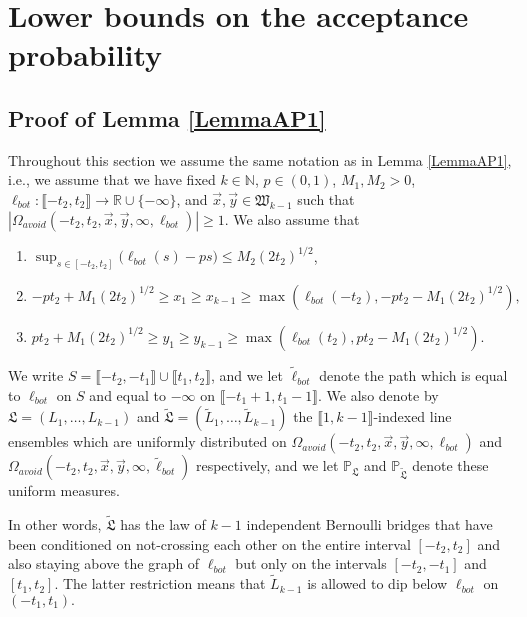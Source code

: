 %
\section{Lower bounds on the acceptance probability}\label{Section6}

\subsection{Proof of Lemma \ref{LemmaAP1}}\label{sect61} Throughout this section we assume the same notation as in Lemma \ref{LemmaAP1}, i.e., we assume that we have fixed $k \in \mathbb{N}$, $p \in (0,1)$, $M_1, M_2 > 0$, $\ell_{bot}: \llbracket -t_2, t_2 \rrbracket \rightarrow \mathbb{R} \cup \{ - \infty \}$, and $\vec{x}, \vec{y} \in \mathfrak{W}_{k-1}$ such that $|\Omega_{avoid}(-t_2, t_2, \vec{x}, \vec{y}, \infty, \ell_{bot})| \geq 1$. We also assume that
\begin{enumerate}
	\item $\sup_{s \in [- t_2,t_2]}\big(\ell_{bot}(s)  - ps \big)  \leq M_2 (2t_2)^{1/2}$,
	\item  $-pt_2 + M_1 (2t_2)^{1/2} \geq  x_1 \geq  x_{k-1} \geq \max\left(\ell_{bot}(-t_2), -pt_2- M_1 (2t_2)^{1/2}\right),$
	\item $pt_2 + M_1 (2t_2)^{1/2} \geq y_1 \geq y_{k-1} \geq  \max \left( \ell_{bot}(t_2),  p t_2- M_1(2t_2)^{1/2} \right).$
\end{enumerate}

\begin{definition}\label{TildeDef}
	We write $S = \llbracket -t_2,-t_1\rrbracket\cup \llbracket t_1,t_2\rrbracket$, and we let $\tilde{\ell}_{bot}$ denote the path which is equal to $\ell_{bot}$ on $S$ and equal to $-\infty$ on $\llbracket -t_1 + 1, t_1 - 1\rrbracket$. We also denote by $\mathfrak{L} = (L_1,\dots,L_{k-1})$ and $\tilde{\mathfrak{L}} = (\tilde{L}_1, \dots, \tilde{L}_{k-1})$ the $\llbracket 1, k-1 \rrbracket$-indexed line ensembles which are uniformly distributed on $\Omega_{avoid}(-t_2,t_2,\vec{x},\vec{y},\infty,\ell_{bot})$ and $\Omega_{avoid}(-t_2, t_2, \vec{x}, \vec{y}, \infty, \tilde{\ell}_{bot})$ respectively, and we let $\mathbb{P}_{\mathfrak{L}}$ and $\mathbb{P}_{\tilde{\mathfrak{L}}}$ denote these uniform measures.
\end{definition}
In other words, $\tilde{\mathfrak{L}}$ has the law of $k-1$ independent Bernoulli bridges that have been conditioned on not-crossing each other on the entire interval $[-t_2, t_2]$ and also staying above the graph of $\ell_{bot}$ but only on the intervals $[-t_2, -t_1]$ and $[t_1, t_2]$. The latter restriction means that $\tilde{L}_{k-1}$ is allowed to dip below $\ell_{bot}$ on $(-t_1, t_1).$ 

